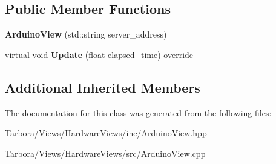 \subsection*{Public Member Functions}
\begin{DoxyCompactItemize}
\item 
\mbox{\label{classTarbora_1_1ArduinoView_a73cf6a2a53d6e9db6311bb55a75a0a92}} 
{\bfseries Arduino\+View} (std\+::string server\+\_\+address)
\item 
\mbox{\label{classTarbora_1_1ArduinoView_aadf679fd61cf289500c153227cab946b}} 
virtual void {\bfseries Update} (float elapsed\+\_\+time) override
\end{DoxyCompactItemize}
\subsection*{Additional Inherited Members}


The documentation for this class was generated from the following files\+:\begin{DoxyCompactItemize}
\item 
Tarbora/\+Views/\+Hardware\+Views/inc/Arduino\+View.\+hpp\item 
Tarbora/\+Views/\+Hardware\+Views/src/Arduino\+View.\+cpp\end{DoxyCompactItemize}
